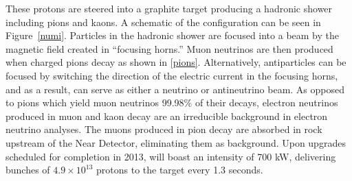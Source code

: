 These protons are steered into a graphite target producing a hadronic shower including pions and kaons.  A schematic of the \numi configuration can be seen in Figure~\ref{numi}.  Particles in the hadronic shower are focused into a beam by the magnetic field created in ``focusing horns.''    Muon neutrinos are then produced when charged pions decay as shown in \eqref{pions}.  Alternatively, antiparticles can be focused by switching the direction of the electric current in the focusing horns, and as a result, \numi can serve as either a neutrino or antineutrino beam.  As opposed to pions which yield muon neutrinos 99.98\% of their decays, electron neutrinos produced in muon and kaon decay are an irreducible background in electron neutrino analyses.  The muons produced in pion decay are absorbed in rock upstream of the \nova Near Detector, eliminating them as background.  Upon upgrades scheduled for completion in 2013, \numi will boast an intensity of 700 kW, delivering bunches of $4.9 \times 10^{13}$ protons to the target every 1.3 seconds.\cite{tdr}

